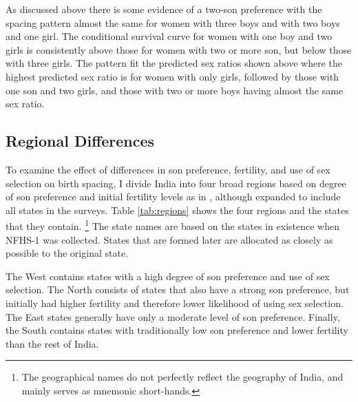\documentclass[12pt,letterpaper]{article}
\begin{document}
As discussed above there is some evidence of a two-son preference with
the spacing pattern almost the same for women with three boys and with
two boys and one girl.
The conditional survival curve for women with one boy and two girls is
consistently above those for women with two or more son, but below those 
with three girls.
The pattern fit the predicted sex ratios shown above where the highest
predicted sex ratio is for women with only girls, followed by those
with one son and two girls, and those with two or more boys having
almost the same sex ratio.


\subsection{Regional Differences\label{sec:regional}}


To examine the effect of differences in son preference, fertility, and use of sex 
selection on birth spacing, I divide India into four broad regions based on degree of 
son preference and initial fertility levels as in  \citet{retherford03b}, although 
expanded to include all states in the surveys.
Table \ref{tab:regions} shows the four regions and the states that they contain.%
\footnote{
The geographical names do not perfectly reflect the geography of India, and mainly
serves as mnemonic short-hands.
}
The state names are based on the states in existence when NFHS-1 was collected.
States that are formed later are allocated as closely as possible to the original state.



The West contains states with a high degree of son preference and use of sex selection.
The North consists of states that also have a strong son preference, but initially had
higher fertility and therefore lower likelihood of using sex selection.
The East states generally have only a moderate level of son preference.
Finally, the South contains states with traditionally low son preference and lower
fertility than the rest of India.


\end{document}
